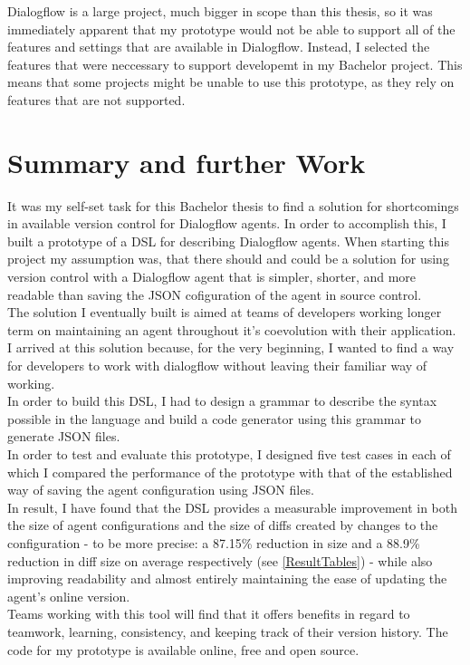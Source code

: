 Dialogflow is a large project, much bigger in scope than this thesis, so it was immediately apparent that my prototype would not be able to support all of the features and settings that are available in Dialogflow.
Instead, I selected the features that were neccessary to support developemt in my Bachelor project.
This means that some projects might be unable to use this prototype, as they rely on features that are not supported.


\chapter{Summary and further Work}

It was my self-set task for this Bachelor thesis to find a solution for shortcomings in available version control for Dialogflow agents. In order to accomplish this, I built a prototype of a DSL for describing Dialogflow agents.
When starting this project my assumption was, that there should and could be a solution for using version control with a Dialogflow agent that is simpler, shorter, and more readable than saving the JSON cofiguration of the agent in source control.\\
The solution I eventually built is aimed at teams of developers working longer term on maintaining an agent throughout it's coevolution with their application.
I arrived at this solution because, for the very beginning, I wanted to find a way for developers to work with dialogflow without leaving their familiar way of working.\\
In order to build this DSL, I had to design a grammar to describe the syntax possible in the language and build a code generator using this grammar to generate JSON files.\\
In order to test and evaluate this prototype, I designed five test cases in each of which I compared the performance of the prototype with that of the established way of saving the agent configuration using JSON files.\\
In result, I have found that the DSL provides a measurable improvement in both the size of agent configurations and the size of diffs created by changes to the configuration - to be more precise: a 87.15\% reduction in size and a 88.9\% reduction in diff size on average respectively (see \autoref{ResultTables}) - while also improving readability and almost entirely maintaining the ease of updating the agent's online version.\\
Teams working with this tool will find that it offers benefits in regard to teamwork, learning, consistency, and keeping track of their version history.
The code for my prototype is available online, free and open source.

